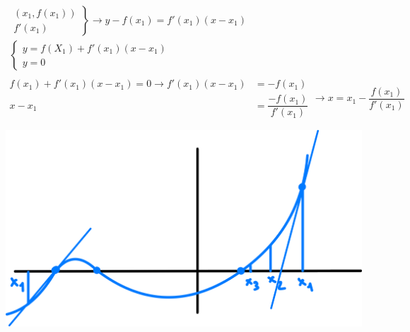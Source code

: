 \documentclass[12pt]{article}
\begin{document}
$\begin{array}{r}
	\left.\begin{array}{r}
		(x_1,f(x_1))\\
		f'(x_1)
	\end{array}\right\}\longrightarrow y-f(x_1)=f'(x_1)(x-x_1)\\
	\begin{cases}
		y=f(X_1)+f'(x_1)(x-x_1)\\
		y=0
	\end{cases}\\
\end{array}$\\
$	\begin{aligned}
	f(x_1)+f'(x_1)(x-x_1)=0\longrightarrow f'(x_1)(x-x_1) &=-f(x_1)\\
	x-x_1&=\dfrac{-f(x_1)}{f'(x_1)}
\end{aligned}\longrightarrow x=x_1-\dfrac{f(x_1)}{f'(x_1)}$

\begin{center}
	\includegraphics[width=0.5\linewidth]{"imagenes/Gráfica 03-11"}
\end{center}
\end{document}

